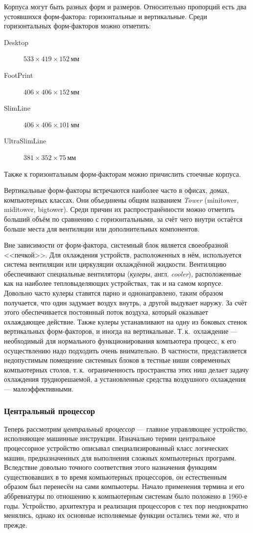 Корпуса могут быть разных форм и размеров. Относительно пропорций есть два устоявшихся форм-фактора: горизонтальные и вертикальные. Среди горизонтальных форм-факторов можно отметить:
\begin{description}
 \item[Desktop] $533\times419\times152$\,мм
 \item[FootPrint] $406\times406\times152$\,мм
 \item[SlimLine] $406\times406\times101$\,мм
 \item[UltraSlimLine] $381\times352\times75$\,мм
\end{description}
Также к горизонтальным форм-факторам можно причислить стоечные корпуса.

Вертикальные форм-факторы встречаются наиболее часто в офисах, домах, компьютерных классах. Они объединены общим названием \emph{Tower} (minitower, miditower, bigtower). Среди причин их распространённости можно отметить больший объём по сравнению с горизонтальными, за счёт чего внутри остаётся больше места для вентиляции или дополнительных компонентов.

Вне зависимости от форм-фактора, системный блок является своеобразной <<печкой>>. Для охлаждения устройств, расположенных в нём, используется система вентиляции или циркуляции охлаждённой жидкости. Вентиляцию обеспечивают специальные вентиляторы (\emph{кулеры}, англ. \emph{cooler}), расположенные как на наиболее тепловыделяющих уст\-ройствах, так и на самом корпусе.
Довольно часто кулеры ставятся парно и однонаправлено, таким образом получается, что один задумает воздух внутрь, а другой выдувает наружу. За счёт этого обеспечивается постоянный поток воздуха, который оказывает охлаждающее действие.
Также кулеры устанавливают на одну из боковых стенок вертикальных форм-факторов, и иногда на вертикальные. Т.\,к.~охлаждение --- необходимый для нормального функционирования компьютера процесс, к его осуществлению надо подходить очень внимательно.
В частности, представляется недопустимым помещение системных блоков в тестные ниши современных компьютерных столов, т.\,к.~ограниченность пространства этих ниш делает задачу охлаждения труднорешаемой, а установленные средства воздушного охлаждения --- малоэффективными.

\subsubsection{Центральный процессор}\label{base:introduction:components:cpu}
Теперь рассмотрим \emph{центральный процессор} --- главное управляющее устройство, исполняющее машинные инструкции.
Изначально термин центральное процессорное устройство описывал специализированный класс логических машин, предназначенных для выполнения сложных компьютерных программ.
Вследствие довольно точного соответствия этого назначения функциям существовавших в то время компьютерных процессоров, он естественным образом был перенесён на сами компьютеры.
Начало применения термина и его аббревиатуры по отношению к компьютерным системам было положено в 1960-е годы.
Устройство, архитектура и реализация процессоров с тех пор неоднократно менялись, однако их основные исполняемые функции остались теми же, что и прежде.

